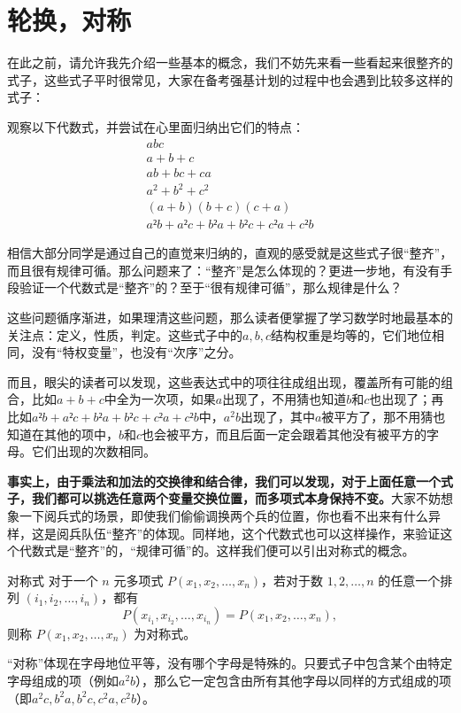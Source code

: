 \section{轮换，对称}
在此之前，请允许我先介绍一些基本的概念，我们不妨先来看一些看起来很整齐的式子，这些式子平时很常见，大家在备考强基计划的过程中也会遇到比较多这样的式子：
\begin{example}{}{}
    观察以下代数式，并尝试在心里面归纳出它们的特点：\vspace{-10pt}
    \begin{gather*}
        abc\\
        a+b+c \\
        ab+bc+ca \\
        a^2+b^2+c^2 \\
        (a+b)(b+c)(c+a)\\
        a²b + a²c + b²a + b²c + c²a + c²b
    \end{gather*}
\end{example}
\begin{solution}
    相信大部分同学是通过自己的直觉来归纳的，直观的感受就是这些式子很“整齐”，而且很有规律可循。那么问题来了：“整齐”是怎么体现的？更进一步地，有没有手段验证一个代数式是“整齐”的？至于“很有规律可循”，那么规律是什么？
    
    这些问题循序渐进，如果理清这些问题，那么读者便掌握了学习数学时地最基本的关注点：定义，性质，判定。这些式子中的$a,b,c$​​结构权重是均等的​​，它们地位相同，没有“特权变量”，也没有“次序”之分。
    
    而且，眼尖的读者可以发现，这些表达式中的项往往成组出现​​，覆盖所有可能的组合，比如$a+b+c$中全为一次项，如果$a$出现了，不用猜也知道$b$和$c$也出现了；再比如$a²b + a²c + b²a + b²c + c²a + c²b$中，$a^2b$出现了，其中$a$被平方了，那不用猜也知道在其他的项中，$b$和$c$也会被平方，而且后面一定会跟着其他没有被平方的字母。它们出现的次数相同。
    
    {\heiti\bfseries 事实上，由于乘法和加法的交换律和结合律，我们可以发现，对于上面任意一个式子，我们都可以挑选任意两个变量交换位置，而多项式本身保持不变。}大家不妨想象一下阅兵式的场景，即使我们偷偷调换两个兵的位置，你也看不出来有什么异样，这是阅兵队伍“整齐”的体现。同样地，这个代数式也可以这样操作，来验证这个代数式是“整齐”的，“规律可循”的。这样我们便可以引出对称式的概念。
\end{solution}
\begin{definition}{对称式}{}
    对于一个 $n$ 元多项式 $P(x_1, x_2, \dots, x_n)$，若对于数 $1, 2, \dots, n$ 的任意一个排列 $(i_1, i_2, \dots, i_n)$，都有
    \[
    P(x_{i_1}, x_{i_2}, \dots, x_{i_n}) = P(x_1, x_2, \dots, x_n),
    \]
    则称 $P(x_1, x_2, \dots, x_n)$ 为对称式。
\end{definition}
“对称”​​ 体现在字母地位平等，没有哪个字母是特殊的。只要式子中包含某个由特定字母组成的项（例如$a^2b$），那么它一定包含由所有其他字母以同样的方式组成的项（即$a^2c,b^2a,b^2c,c^2a,c^2b$）。

